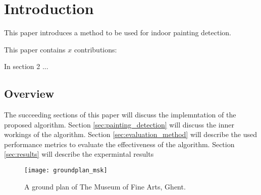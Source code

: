 \section{Introduction}
	This paper introduces a method to be used for indoor painting detection. 
	
	
	
	
	
	
	
	
	This paper contains $x$ contributions:
	
	
	In section 2 ...
	
	\subsection{Overview}
	The succeeding sections of this paper will discuss the implemntation of the proposed algorithm. Section \ref{sec:painting_detection} will discuss the inner workings of the algorithm. Section \ref{sec:evaluation_method} will describe the used performance metrics to evaluate the effectiveness of the algorithm. Section \ref{sec:results} will describe the expermintal results
	

	
	\begin{figure}
		\texttt{[image: groundplan\_msk]}
		\caption{A ground plan of The Museum of Fine Arts, Ghent. }
		\label{fig:groundplan_msk}
	\end{figure}